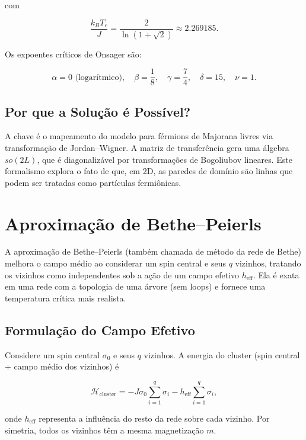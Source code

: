 \documentclass[12pt]{article}
\begin{document}
com

\begin{equation}
    \frac{k_B T_c}{J} = \frac{2}{\ln(1+\sqrt{2})} \approx 2.269185.
\end{equation}

Os expoentes críticos de Onsager são:

\begin{equation}
    \alpha = 0 \text{ (logarítmico)}, \quad \beta = \frac{1}{8}, \quad \gamma = \frac{7}{4}, \quad \delta = 15, \quad \nu = 1.
\end{equation}

\subsection{Por que a Solução é Possível?}

A chave é o mapeamento do modelo para férmions de Majorana livres via transformação de Jordan–Wigner. A matriz de transferência gera uma álgebra \(so(2L)\), que é diagonalizável por transformações de Bogoliubov lineares. Este formalismo explora o fato de que, em 2D, as paredes de domínio são linhas que podem ser tratadas como partículas fermiônicas.

\section{Aproximação de Bethe–Peierls}

A aproximação de Bethe–Peierls (também chamada de método da rede de Bethe) melhora o campo médio ao considerar um spin central e seus \(q\) vizinhos, tratando os vizinhos como independentes sob a ação de um campo efetivo \(h_{\text{eff}}\). Ela é exata em uma rede com a topologia de uma árvore (sem loops) e fornece uma temperatura crítica mais realista.

\subsection{Formulação do Campo Efetivo}

Considere um spin central \(\sigma_0\) e seus \(q\) vizinhos. A energia do cluster (spin central + campo médio dos vizinhos) é

\begin{equation}
    \mathcal{H}_{\text{cluster}} = -J \sigma_0 \sum_{i=1}^q \sigma_i - h_{\text{eff}} \sum_{i=1}^q \sigma_i,
\end{equation}

onde \(h_{\text{eff}}\) representa a influência do resto da rede sobre cada vizinho. Por simetria, todos os vizinhos têm a mesma magnetização \(m\).
\end{document}
